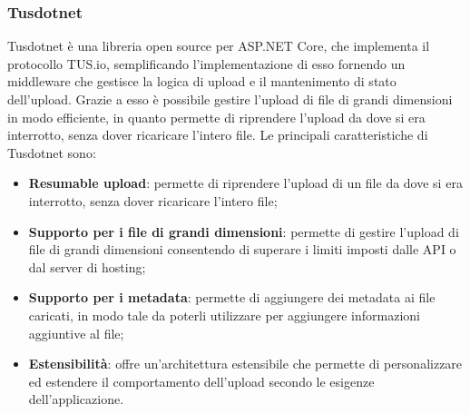 \subsubsection{Tusdotnet}
Tusdotnet è una libreria open source per ASP.NET Core, che implementa il protocollo TUS.io, semplificando l'implementazione di esso fornendo un middleware che gestisce la logica di upload e il mantenimento di stato dell'upload. Grazie a esso è possibile gestire l'upload di file di grandi dimensioni in modo efficiente, in quanto permette di riprendere l'upload da dove si era interrotto, senza dover ricaricare l'intero file. Le principali caratteristiche di Tusdotnet sono:
\begin{itemize}
    \item \textbf{Resumable upload}: permette di riprendere l'upload di un file da dove si era interrotto, senza dover ricaricare l'intero file;
    \item \textbf{Supporto per i file di grandi dimensioni}: permette di gestire l'upload di file di grandi dimensioni consentendo di superare i limiti imposti dalle API o dal server di hosting;
    \item \textbf{Supporto per i metadata}: permette di aggiungere dei metadata ai file caricati, in modo tale da poterli utilizzare per aggiungere informazioni aggiuntive al file;
    \item \textbf{Estensibilità}: offre un'architettura estensibile che permette di personalizzare ed estendere il comportamento dell'upload secondo le esigenze dell'applicazione. 
\end{itemize}

